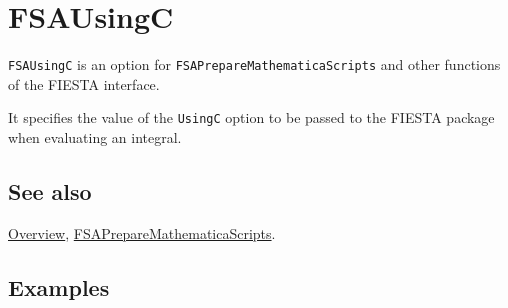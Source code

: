 \documentclass[../FeynHelpersManual.tex]{subfiles}
\begin{document}
\begin{Shaded}
\begin{Highlighting}[]
 
\end{Highlighting}
\end{Shaded}

\hypertarget{fsausingc}{
\section{FSAUsingC}\label{fsausingc}}

\texttt{FSAUsingC} is an option for
\texttt{FSAPrepareMathematicaScripts} and other functions of the FIESTA
interface.

It specifies the value of the \texttt{UsingC} option to be passed to the
FIESTA package when evaluating an integral.

\subsection{See also}

\hyperlink{toc}{Overview},
\hyperlink{fsapreparemathematicascripts}{FSAPrepareMathematicaScripts}.

\subsection{Examples}
\end{document}
